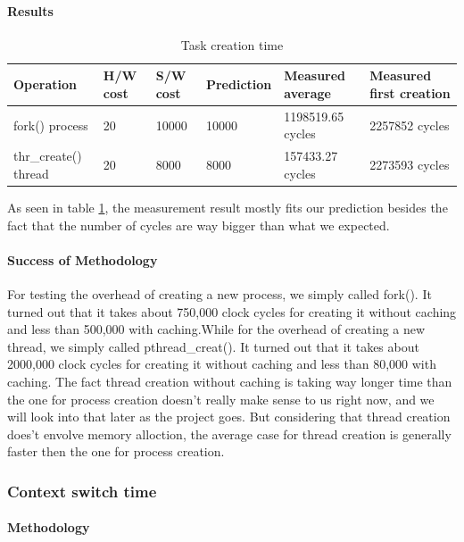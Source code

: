 \paragraph{Results}
\begin{table}[h]
\begin{center}
\begin{tabular}{| l | l | l | l | l | l |}
\hline
Operation & H/W cost & S/W cost & Prediction & Measured average & Measured first creation \\
\hline
fork() process 		& 20  & 10000  	& 10000 & 1198519.65 cycles & 2257852 cycles\\ \hline
thr\_create() thread 	& 20  & 8000	& 8000  &  157433.27 cycles & 2273593 cycles \\ \hline
\end{tabular}
\end{center}
\caption{Task creation time\label{tab:task-creation}}

\end{table}

As seen in table \ref{tab:task-creation}, the measurement result mostly fits our prediction besides the fact that the number of cycles are way bigger than what we expected.
\paragraph{Success of Methodology}
For testing the overhead of creating a new process, we simply called fork(). It turned out that it takes about 750,000 clock cycles for creating it without caching and less than 500,000 with caching.While for the overhead of creating a new thread, we simply called pthread\_creat(). It turned out that it takes about 2000,000 clock cycles for creating it without caching and less than 80,000 with caching.
The fact thread creation without caching is taking way longer time than the one for process creation doesn't really make sense to us right now, and we will look into that later as the project goes. But considering that thread creation does't envolve memory alloction, the average case for thread creation is generally faster then the one for process creation.


\subsubsection{Context switch time}
\paragraph{Methodology}
